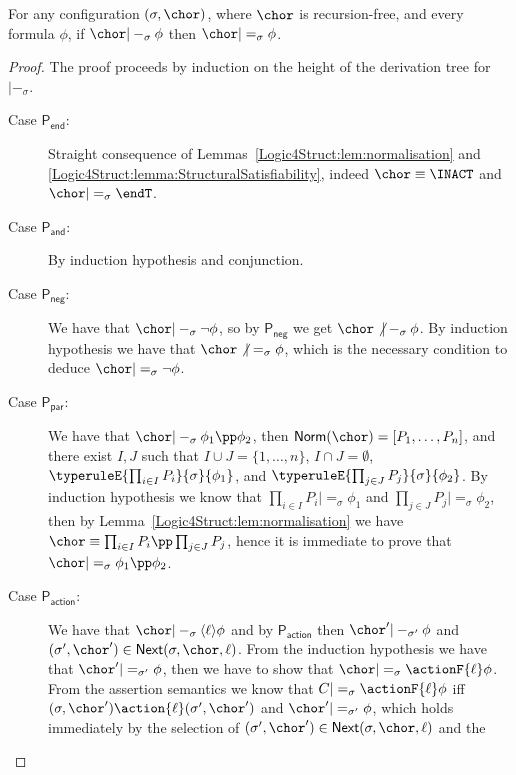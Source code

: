 \begin{theorem}[Soundness]\label{Logic4Struct:thm:soundness}
  For any configuration $(\sigma,\chor)$, where $\chor$ is
  recursion-free, and every formula $\phi$, if $\chor|-_\sigma \phi$
  then $\chor|=_\sigma \phi$.
\end{theorem}
\begin{proof}
The proof proceeds by induction on the height of the derivation tree
for $|-_\sigma$.
  \begin{description}
  \item[Case $\mathsf{P_{end}}$:] Straight consequence of
    Lemmas~\ref{Logic4Struct:lem:normalisation} and
    \ref{Logic4Struct:lemma:StructuralSatisfiability}, indeed $\chor \equiv \INACT$
    and $\chor |=_\sigma \endT$.
  \item[Case $\mathsf{P_{and}}$:] By induction hypothesis and
    conjunction.
  \item[Case $\mathsf{P_{neg}}$:] We have that $\chor|-_\sigma \lnot
    \phi$, so by $\mathsf{P_{neg}}$ we get $\chor \not |-_\sigma
    \phi$. By induction hypothesis we have that $\chor \not |=_\sigma
    \phi$, which is the necessary condition to deduce $\chor |=_\sigma
    \lnot \phi$.
  \item[Case $\mathsf{P_{par}}$:] We have that $\chor |-_\sigma
    \phi_1\pp \phi_2$, then $\textsf{Norm}(\chor) = [P_1,\dots,P_n]$,
    and there exist $I,J$ such that $I\cup J = \{1,\dots,n\}$, $I\cap J
    = \emptyset$, $\typeruleE{\prod_{i\in I} P_i}{\sigma}{\phi_1}$, and
    $\typeruleE{\prod_{j\in J} P_j}{\sigma}{\phi_2}$. By induction
    hypothesis we know that $\prod_{i\in I} P_i |=_\sigma \phi_1$ and
    $\prod_{j\in J} P_j |=_\sigma \phi_2$, then by
    Lemma~\ref{Logic4Struct:lem:normalisation} we have $\chor \equiv \prod_{i\in I}
    P_i \pp \prod_{j\in J} P_j$, hence it is immediate to prove that
    $\chor |=_\sigma \phi_1 \pp \phi_2$.
  \item[Case $\mathsf{P_{action}}$:] We have that $\chor |-_\sigma
    \langle \ell \rangle \phi$ and by $\mathsf{P_{action}}$ then
    $\chor' |-_{\sigma'} \phi$ and $(\sigma', \chor') \in
    \textsf{Next}(\sigma, \chor, \ell)$. From the induction hypothesis
    we have that $\chor' |=_{\sigma'} \phi$, then we have to show that
    $\chor |=_\sigma \actionF{\ell} \phi$. From the assertion
    semantics we know that $C |=_\sigma \actionF{\ell} \phi$ iff
    $(\sigma, \chor') \action{\ell} (\sigma', \chor')$ and $\chor'
    |=_{\sigma'} \phi$, which holds immediately by the selection of
    $(\sigma', \chor') \in \textsf{Next}(\sigma, \chor,\ell)$ and the

\end{description}
\end{proof}
